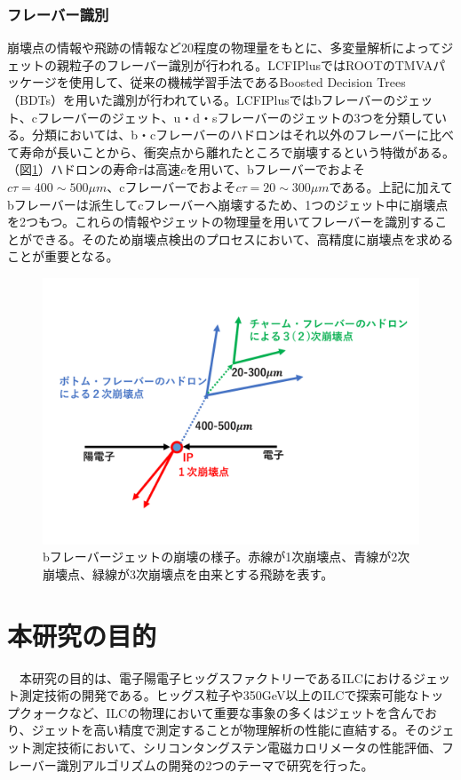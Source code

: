 \subsubsection{フレーバー識別}
崩壊点の情報や飛跡の情報など20程度の物理量をもとに、多変量解析によってジェットの親粒子のフレーバー識別が行われる。LCFIPlusではROOTのTMVAパッケージを使用して、従来の機械学習手法であるBoosted Decision Trees（BDTs）を用いた識別が行われている。LCFIPlusではbフレーバーのジェット、cフレーバーのジェット、u・d・sフレーバーのジェットの3つを分類している。分類においては、b・cフレーバーのハドロンはそれ以外のフレーバーに比べて寿命が長いことから、衝突点から離れたところで崩壊するという特徴がある。（図\ref{bcjets}）ハドロンの寿命$\tau$は高速$c$を用いて、bフレーバーでおよそ$c\tau = 400 \sim 500 \mu m$、cフレーバーでおよそ$c\tau = 20 \sim 300 \mu m$である。上記に加えてbフレーバーは派生してcフレーバーへ崩壊するため、1つのジェット中に崩壊点を2つもつ。これらの情報やジェットの物理量を用いてフレーバーを識別することができる。そのため崩壊点検出のプロセスにおいて、高精度に崩壊点を求めることが重要となる。
\begin{figure}[h]
	\begin{center}
 \includegraphics[keepaspectratio, scale=0.4]
 	{Figure/Introduction/bcjets.pdf}
 		\caption {bフレーバージェットの崩壊の様子。赤線が1次崩壊点、青線が2次崩壊点、緑線が3次崩壊点を由来とする飛跡を表す。}
 		\label{bcjets}
	\end{center}
\end{figure}
\section{本研究の目的}
　本研究の目的は、電子陽電子ヒッグスファクトリーであるILCにおけるジェット測定技術の開発である。ヒッグス粒子や350GeV以上のILCで探索可能なトップクォークなど、ILCの物理において重要な事象の多くはジェットを含んでおり、ジェットを高い精度で測定することが物理解析の性能に直結する。そのジェット測定技術において、シリコンタングステン電磁カロリメータの性能評価、フレーバー識別アルゴリズムの開発の2つのテーマで研究を行った。\\
